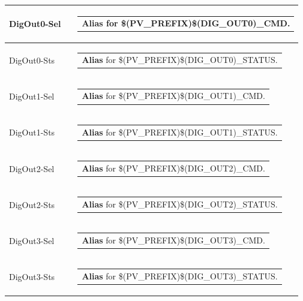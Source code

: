\documentclass[openany]{article}
\begin{document}
\begin{longtable}{| m{4.5cm} m{2.5cm}  m{8.5cm} |}
        DigOut0-Sel &  & \begin{tabular}{@{}m{6cm}@{}}
                \textbf{\color{blue} Alias} for \$(PV\_PREFIX)\$(DIG\_OUT0)\_CMD.
            \end{tabular} \hypertarget{}{}\\ \hline
        DigOut0-Sts &  & \begin{tabular}{@{}m{6cm}@{}}
                \textbf{\color{blue} Alias} for \$(PV\_PREFIX)\$(DIG\_OUT0)\_STATUS.
            \end{tabular} \hypertarget{pv:dig-out-1}{}\\ \hline
        DigOut1-Sel &  & \begin{tabular}{@{}m{6cm}@{}}
                \textbf{\color{blue} Alias} for \$(PV\_PREFIX)\$(DIG\_OUT1)\_CMD.
            \end{tabular} \hypertarget{}{}\\ \hline
        DigOut1-Sts &  & \begin{tabular}{@{}m{6cm}@{}}
                \textbf{\color{blue} Alias} for \$(PV\_PREFIX)\$(DIG\_OUT1)\_STATUS.
            \end{tabular} \hypertarget{pv:dig-out-2}{}\\ \hline
        DigOut2-Sel &  & \begin{tabular}{@{}m{6cm}@{}}
                \textbf{\color{blue} Alias} for \$(PV\_PREFIX)\$(DIG\_OUT2)\_CMD.
            \end{tabular} \hypertarget{}{}\\ \hline
        DigOut2-Sts &  & \begin{tabular}{@{}m{6cm}@{}}
                \textbf{\color{blue} Alias} for \$(PV\_PREFIX)\$(DIG\_OUT2)\_STATUS.
            \end{tabular} \hypertarget{pv:dig-out-3}{}\\ \hline
        DigOut3-Sel &  & \begin{tabular}{@{}m{6cm}@{}}
                \textbf{\color{blue} Alias} for \$(PV\_PREFIX)\$(DIG\_OUT3)\_CMD.
            \end{tabular} \hypertarget{}{}\\ \hline
        DigOut3-Sts &  & \begin{tabular}{@{}m{6cm}@{}}
                \textbf{\color{blue} Alias} for \$(PV\_PREFIX)\$(DIG\_OUT3)\_STATUS.
            \end{tabular} \hypertarget{pv:dig-in-0}{}\\ \hline

\end{longtable}
\end{document}
